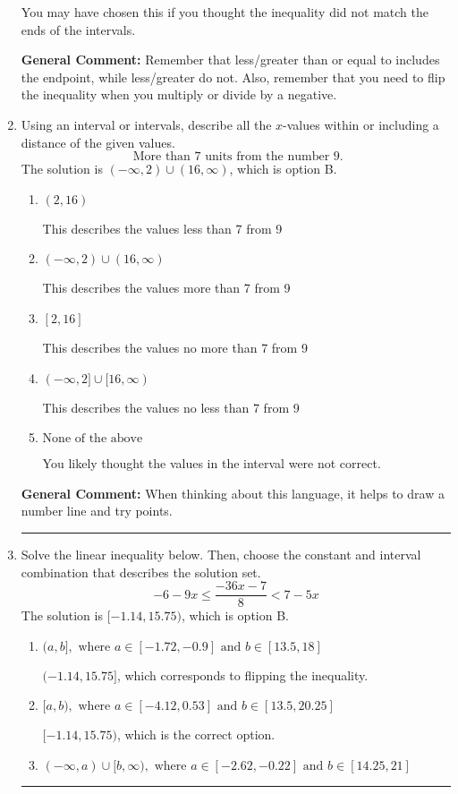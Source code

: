 \documentclass{extbook}[14pt]
\newcommand{\litem}[1]{\item #1

\rule{\textwidth}{0.4pt}}
\begin{document}
\begin{enumerate}
{\begin{enumerate}[label=\Alph*.]
You may have chosen this if you thought the inequality did not match the ends of the intervals.
\end{enumerate}

\textbf{General Comment:} Remember that less/greater than or equal to includes the endpoint, while less/greater do not. Also, remember that you need to flip the inequality when you multiply or divide by a negative.
}
\litem{
Using an interval or intervals, describe all the $x$-values within or including a distance of the given values.
\[ \text{ More than } 7 \text{ units from the number } 9. \]The solution is \( (-\infty, 2) \cup (16, \infty) \), which is option B.\begin{enumerate}[label=\Alph*.]
\item \( (2, 16) \)

This describes the values less than 7 from 9
\item \( (-\infty, 2) \cup (16, \infty) \)

This describes the values more than 7 from 9
\item \( [2, 16] \)

This describes the values no more than 7 from 9
\item \( (-\infty, 2] \cup [16, \infty) \)

This describes the values no less than 7 from 9
\item \( \text{None of the above} \)

You likely thought the values in the interval were not correct.
\end{enumerate}

\textbf{General Comment:} When thinking about this language, it helps to draw a number line and try points.
}
\litem{
Solve the linear inequality below. Then, choose the constant and interval combination that describes the solution set.
\[ -6 - 9 x \leq \frac{-36 x - 7}{8} < 7 - 5 x \]The solution is \( [-1.14, 15.75) \), which is option B.\begin{enumerate}[label=\Alph*.]
\item \( (a, b], \text{ where } a \in [-1.72, -0.9] \text{ and } b \in [13.5, 18] \)

$(-1.14, 15.75]$, which corresponds to flipping the inequality.
\item \( [a, b), \text{ where } a \in [-4.12, 0.53] \text{ and } b \in [13.5, 20.25] \)

$[-1.14, 15.75)$, which is the correct option.
\item \( (-\infty, a) \cup [b, \infty), \text{ where } a \in [-2.62, -0.22] \text{ and } b \in [14.25, 21] \)


\end{enumerate}}
\end{enumerate}
\end{document}

